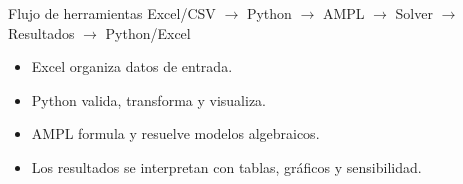 \documentclass[aspectratio=169]{beamer}
\begin{document}
\begin{frame}{Flujo de herramientas}
\centering
Excel/CSV $\rightarrow$ Python $\rightarrow$ AMPL $\rightarrow$ Solver $\rightarrow$ Resultados $\rightarrow$ Python/Excel
\vspace{0.4cm}

\begin{itemize}
\item Excel organiza datos de entrada.
\item Python valida, transforma y visualiza.
\item AMPL formula y resuelve modelos algebraicos.
\item Los resultados se interpretan con tablas, gráficos y sensibilidad.
\end{itemize}
\end{frame}
\end{document}
